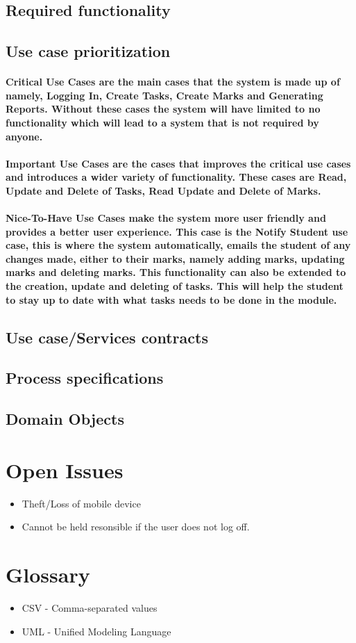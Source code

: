 \documentclass[12pt]{article}
\begin{document}
  \subsection{Required functionality}
 \subsection{Use case prioritization}
 \paragraph*{Critical Use Cases are the main cases that the system is made up of namely, Logging In, Create Tasks, Create Marks and Generating Reports. Without these cases the system will have limited to no functionality which will lead to a system that is not required by anyone.}
 \paragraph*{Important Use Cases are the cases that improves the critical use cases and introduces a wider variety of functionality. These cases are Read, Update and Delete of Tasks, Read Update  and Delete of Marks.}
 \paragraph*{Nice-To-Have Use Cases make the system more user friendly and provides a better user experience. This case is the Notify Student use case, this is where the system automatically, emails the student of any changes made, either to their marks, namely adding marks, updating marks and deleting marks. This functionality can also be extended to the creation, update and deleting of tasks. This will help the student to stay up to date with what tasks needs to be done in the module.}
 \subsection{Use case/Services contracts}
 \subsection{Process specifications}
 \subsection{Domain Objects}
 \section{Open Issues}
\begin{itemize}
  \item Theft/Loss of mobile device
  \item Cannot be held resonsible if the user does not log off.
\end{itemize}
 \section{Glossary} 
 \begin{itemize}
  \item CSV - Comma-separated values
  \item UML - Unified Modeling Language
\end{itemize}
\end{document}
